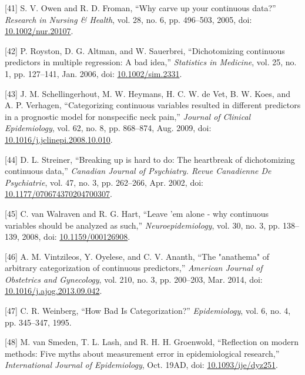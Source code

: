 \documentclass[
]{article}
\newenvironment{cslreferences}%
  {}%
  {\par}
\begin{document}
\begin{cslreferences}
\leavevmode\hypertarget{ref-owen_why_2005}{}%
{[}41{]} S. V. Owen and R. D. Froman, ``Why carve up your continuous data?'' \emph{Research in Nursing \& Health}, vol. 28, no. 6, pp. 496--503, 2005, doi: \href{https://doi.org/10.1002/nur.20107}{10.1002/nur.20107}.

\leavevmode\hypertarget{ref-royston_dichotomizing_2006}{}%
{[}42{]} P. Royston, D. G. Altman, and W. Sauerbrei, ``Dichotomizing continuous predictors in multiple regression: A bad idea,'' \emph{Statistics in Medicine}, vol. 25, no. 1, pp. 127--141, Jan. 2006, doi: \href{https://doi.org/10.1002/sim.2331}{10.1002/sim.2331}.

\leavevmode\hypertarget{ref-schellingerhout_categorizing_2009}{}%
{[}43{]} J. M. Schellingerhout, M. W. Heymans, H. C. W. de Vet, B. W. Koes, and A. P. Verhagen, ``Categorizing continuous variables resulted in different predictors in a prognostic model for nonspecific neck pain,'' \emph{Journal of Clinical Epidemiology}, vol. 62, no. 8, pp. 868--874, Aug. 2009, doi: \href{https://doi.org/10.1016/j.jclinepi.2008.10.010}{10.1016/j.jclinepi.2008.10.010}.

\leavevmode\hypertarget{ref-streiner_breaking_2002}{}%
{[}44{]} D. L. Streiner, ``Breaking up is hard to do: The heartbreak of dichotomizing continuous data,'' \emph{Canadian Journal of Psychiatry. Revue Canadienne De Psychiatrie}, vol. 47, no. 3, pp. 262--266, Apr. 2002, doi: \href{https://doi.org/10.1177/070674370204700307}{10.1177/070674370204700307}.

\leavevmode\hypertarget{ref-van_walraven_leave_2008}{}%
{[}45{]} C. van Walraven and R. G. Hart, ``Leave 'em alone - why continuous variables should be analyzed as such,'' \emph{Neuroepidemiology}, vol. 30, no. 3, pp. 138--139, 2008, doi: \href{https://doi.org/10.1159/000126908}{10.1159/000126908}.

\leavevmode\hypertarget{ref-vintzileos_anathema_2014}{}%
{[}46{]} A. M. Vintzileos, Y. Oyelese, and C. V. Ananth, ``The "anathema" of arbitrary categorization of continuous predictors,'' \emph{American Journal of Obstetrics and Gynecology}, vol. 210, no. 3, pp. 200--203, Mar. 2014, doi: \href{https://doi.org/10.1016/j.ajog.2013.09.042}{10.1016/j.ajog.2013.09.042}.

\leavevmode\hypertarget{ref-weinberg_how_1995}{}%
{[}47{]} C. R. Weinberg, ``How Bad Is Categorization?'' \emph{Epidemiology}, vol. 6, no. 4, pp. 345--347, 1995.

\leavevmode\hypertarget{ref-van_smeden_reflection_2019}{}%
{[}48{]} M. van Smeden, T. L. Lash, and R. H. H. Groenwold, ``Reflection on modern methods: Five myths about measurement error in epidemiological research,'' \emph{International Journal of Epidemiology}, Oct. 19AD, doi: \href{https://doi.org/10.1093/ije/dyz251}{10.1093/ije/dyz251}.


\end{cslreferences}
\end{document}
